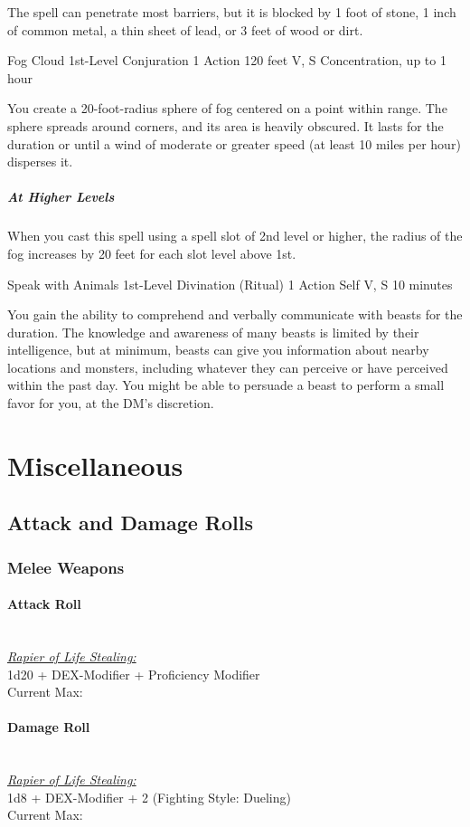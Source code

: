 \documentclass[letterpaper,openany,oneside,twocolumn]{book}
\begin{document}
The spell can penetrate most barriers, but it is blocked by 1 foot of stone, 1 inch of common metal, a thin sheet of lead, or 3 feet of wood or dirt.

\DndSpellHeader
  {Fog Cloud}
  {1st-Level Conjuration}
  {1 Action}
  {120 feet}
  {V, S}
  {Concentration, up to 1 hour}

You create a 20-foot-radius sphere of fog centered on a point within range. The sphere spreads around corners, and its area is heavily obscured. It lasts for the duration or until a wind of moderate or greater speed (at least 10 miles per hour) disperses it.

\subparagraph*{At Higher Levels} When you cast this spell using a spell slot of 2nd level or higher, the radius of the fog increases by 20 feet for each slot level above 1st.

\DndSpellHeader
  {Speak with Animals}
  {1st-Level Divination (Ritual)}
  {1 Action}
  {Self}
  {V, S}
  {10 minutes}

You gain the ability to comprehend and verbally communicate with beasts for the duration. The knowledge and awareness of many beasts is limited by their intelligence, but at minimum, beasts can give you information about nearby locations and monsters, including whatever they can perceive or have perceived within the past day. You might be able to persuade a beast to perform a small favor for you, at the DM's discretion.
\vfill\eject
\section*{Miscellaneous}
\subsection*{Attack and Damage Rolls}
\subsubsection*{Melee Weapons}
\paragraph*{Attack Roll}\hfill\\
\underline{\textit{Rapier of Life Stealing:}}\\
1d20 + DEX-Modifier + Proficiency Modifier\\
\indent Current Max: 
\paragraph*{Damage Roll}\hfill\\
\underline{\textit{Rapier of Life Stealing:}}\\
1d8 + DEX-Modifier + 2 (Fighting Style: Dueling)\\
\indent Current Max: 
\end{document}
